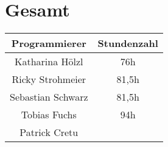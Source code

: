 \section{Gesamt}
\begin{center}
	\begin{tabular}{|c|c|}
		\hline \textbf{Programmierer} & \textbf{Stundenzahl} \\ 
		\hline Katharina Hölzl  &  76h\\ 
		\hline Ricky Strohmeier & 81,5h \\ 
		\hline Sebastian Schwarz & 81,5h \\ 
		\hline Tobias Fuchs &  94h\\ 
		\hline Patrick Cretu &  \\ 
		\hline 
	\end{tabular}
\end{center} 